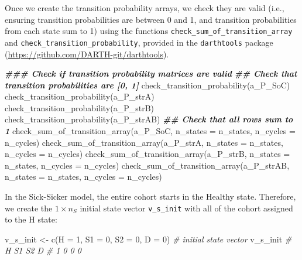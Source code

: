 \documentclass[
]{article}
\newenvironment{Shaded}{\begin{snugshade}}{\end{snugshade}}
\newcommand{\AttributeTok}[1]{\textcolor[rgb]{0.77,0.63,0.00}{#1}}
\newcommand{\CommentTok}[1]{\textcolor[rgb]{0.56,0.35,0.01}{\textit{#1}}}
\newcommand{\DecValTok}[1]{\textcolor[rgb]{0.00,0.00,0.81}{#1}}
\newcommand{\DocumentationTok}[1]{\textcolor[rgb]{0.56,0.35,0.01}{\textbf{\textit{#1}}}}
\newcommand{\FunctionTok}[1]{\textcolor[rgb]{0.00,0.00,0.00}{#1}}
\newcommand{\NormalTok}[1]{#1}
\newcommand{\OtherTok}[1]{\textcolor[rgb]{0.56,0.35,0.01}{#1}}
\begin{document}
Once we create the transition probability arrays, we check they are valid (i.e., ensuring transition probabilities are between 0 and 1, and transition probabilities from each state sum to 1) using the functions \texttt{check\_sum\_of\_transition\_array} and \texttt{check\_transition\_probability}, provided in the \texttt{darthtools} package (\url{https://github.com/DARTH-git/darthtools}).

\begin{Shaded}
\begin{Highlighting}[]
\DocumentationTok{\#\#\# Check if transition probability matrices are valid}
\DocumentationTok{\#\# Check that transition probabilities are [0, 1]}
\FunctionTok{check\_transition\_probability}\NormalTok{(a\_P\_SoC)}
\FunctionTok{check\_transition\_probability}\NormalTok{(a\_P\_strA)}
\FunctionTok{check\_transition\_probability}\NormalTok{(a\_P\_strB)}
\FunctionTok{check\_transition\_probability}\NormalTok{(a\_P\_strAB)}
\DocumentationTok{\#\# Check that all rows sum to 1}
\FunctionTok{check\_sum\_of\_transition\_array}\NormalTok{(a\_P\_SoC, }\AttributeTok{n\_states =}\NormalTok{ n\_states, }\AttributeTok{n\_cycles =}\NormalTok{ n\_cycles)}
\FunctionTok{check\_sum\_of\_transition\_array}\NormalTok{(a\_P\_strA, }\AttributeTok{n\_states =}\NormalTok{ n\_states, }\AttributeTok{n\_cycles =}\NormalTok{ n\_cycles)}
\FunctionTok{check\_sum\_of\_transition\_array}\NormalTok{(a\_P\_strB, }\AttributeTok{n\_states =}\NormalTok{ n\_states, }\AttributeTok{n\_cycles =}\NormalTok{ n\_cycles)}
\FunctionTok{check\_sum\_of\_transition\_array}\NormalTok{(a\_P\_strAB, }\AttributeTok{n\_states =}\NormalTok{ n\_states, }\AttributeTok{n\_cycles =}\NormalTok{ n\_cycles)}
\end{Highlighting}
\end{Shaded}

In the Sick-Sicker model, the entire cohort starts in the Healthy state. Therefore, we create the \(1 \times n_S\) initial state vector \texttt{v\_s\_init} with all of the cohort assigned to the H state:

\begin{Shaded}
\begin{Highlighting}[]
\NormalTok{v\_s\_init }\OtherTok{\textless{}{-}} \FunctionTok{c}\NormalTok{(}\AttributeTok{H =} \DecValTok{1}\NormalTok{, }\AttributeTok{S1 =} \DecValTok{0}\NormalTok{, }\AttributeTok{S2 =} \DecValTok{0}\NormalTok{, }\AttributeTok{D =} \DecValTok{0}\NormalTok{) }\CommentTok{\# initial state vector}
\NormalTok{v\_s\_init}
\CommentTok{\#  H S1 S2  D }
\CommentTok{\#  1  0  0  0}
\end{Highlighting}
\end{Shaded}
\end{document}
